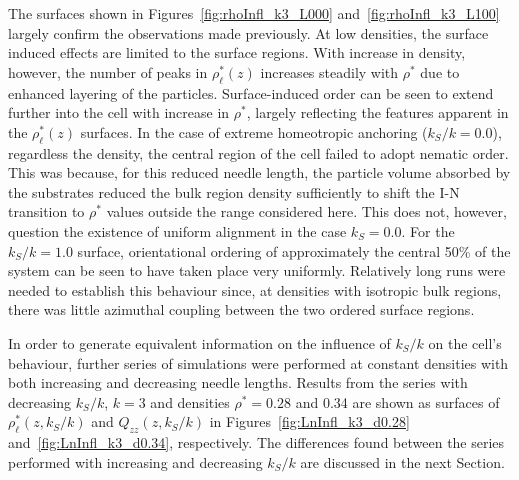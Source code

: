 \documentclass[aps,10pt,twocolumn]{revtex4}
\begin{document}
The surfaces shown in Figures~\ref{fig:rhoInfl_k3_L000} and~\ref{fig:rhoInfl_k3_L100} largely confirm the
observations made previously. At low densities, the surface induced effects are limited to the surface regions.
With increase in density, however, the number of peaks in $\rho^{*}_\ell(z)$ increases steadily with $\rho^*$ due
to enhanced layering of the particles. Surface-induced order can be seen to extend further into the cell with
increase in $\rho^*$, largely reflecting the features apparent in the $\rho^{*}_\ell(z)$ surfaces. In the case of
extreme homeotropic anchoring ($k_S/k = 0.0$), regardless the density, the central region of the cell failed to
adopt nematic order. This was because, for this reduced needle length, the particle volume absorbed by the
substrates reduced the bulk region density sufficiently to shift the I-N transition to $\rho^{*}$ values outside
the range considered here. This does not, however, question the existence of uniform alignment in the case $k_S =
0.0$. For the $k_S/k = 1.0$ surface, orientational ordering of approximately the central 50\% of the system can be
seen to have taken place very uniformly. Relatively long runs were needed to establish this behaviour since, at
densities with isotropic bulk regions, there was little azimuthal coupling between the two ordered surface
regions.


In order to generate equivalent information on the influence of $k_S/k$ on the cell's behaviour, further series of
simulations were performed at constant densities with both increasing and decreasing needle lengths. Results from
the series with decreasing $k_S/k$, $k=3$ and densities $\rho^{*}=0.28$ and 0.34 are shown as surfaces of
$\rho^{*}_\ell(z,k_S/k)$ and $Q_{zz}(z,k_S/k)$ in Figures~\ref{fig:LnInfl_k3_d0.28} and~\ref{fig:LnInfl_k3_d0.34},
respectively. The differences found between the series performed with increasing and decreasing $k_S/k$ are
discussed in the next Section.
\end{document}
